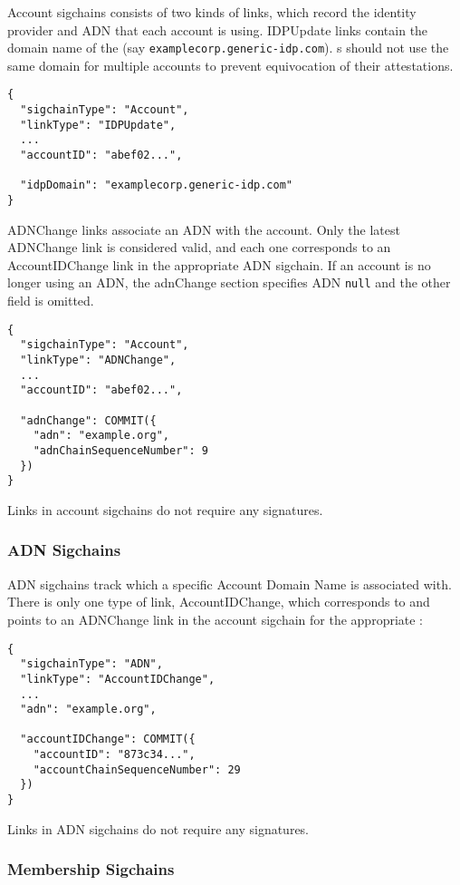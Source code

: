 Account sigchains consists of two kinds of links, which record the identity provider and ADN that
each account is using. \textsf{IDPUpdate} links contain the domain name of the \idp (say
\texttt{examplecorp.generic-idp.com}). {\idp}s should not use the same domain for multiple accounts to prevent equivocation of their attestations.

\begin{Verbatim}
{
  "sigchainType": "Account",
  "linkType": "IDPUpdate",
  ...
  "accountID": "abef02...",

  "idpDomain": "examplecorp.generic-idp.com"
}
\end{Verbatim}

\textsf{ADNChange} links associate an ADN with the account. Only the latest \textsf{ADNChange} link
is considered valid, and each one corresponds to an \textsf{AccountIDChange} link in the appropriate
ADN sigchain. If an account is no longer using an ADN, the \textsf{adnChange} section specifies ADN
\texttt{null} and the other field is omitted.

\begin{Verbatim}
{
  "sigchainType": "Account",
  "linkType": "ADNChange",
  ...
  "accountID": "abef02...",

  "adnChange": COMMIT({
    "adn": "example.org",
    "adnChainSequenceNumber": 9
  })
}
\end{Verbatim}

Links in account sigchains do not require any signatures.

\subsubsection{ADN Sigchains}

ADN sigchains track which \accountID a specific Account Domain Name is associated with. There is
only one type of link, \textsf{AccountIDChange}, which corresponds to and points to an
\textsf{ADNChange} link in the account sigchain for the appropriate \accountID:

\begin{Verbatim}
{
  "sigchainType": "ADN",
  "linkType": "AccountIDChange",
  ...
  "adn": "example.org",

  "accountIDChange": COMMIT({
    "accountID": "873c34...",
    "accountChainSequenceNumber": 29
  })
}
\end{Verbatim}

Links in ADN sigchains do not require any signatures.

\subsubsection{Membership Sigchains}

